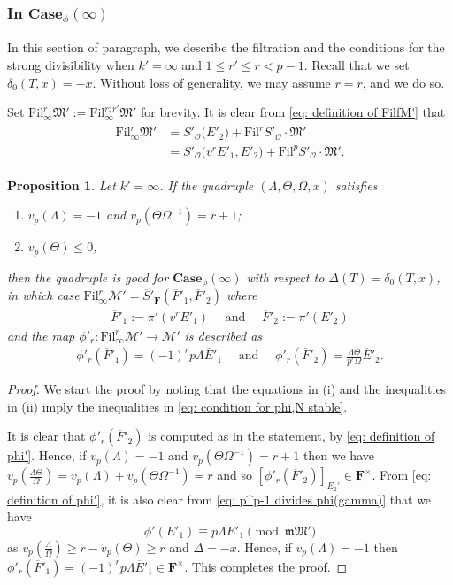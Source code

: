 \documentclass[11pt]{amsart}
\theoremstyle{definition}
\numberwithin{equation}{subsection}
\theoremstyle{plain}
\theoremstyle{plain}
\theoremstyle{plain}
\theoremstyle{plain}
\theoremstyle{plain}
\theoremstyle{plain}
\theoremstyle{plain}
\theoremstyle{plain}
\newtheorem{prop}[equation]{Proposition}
\theoremstyle{plain}
\theoremstyle{plain}
\theoremstyle{plain}
\theoremstyle{plain}
\theoremstyle{definition}
\theoremstyle{definition}
\theoremstyle{definition}
\theoremstyle{remark}
\renewcommand{\(}{\textup{(}}
\renewcommand{\)}{\textup{)}}
\newcommand{\F}{\mathbf{F}}
\newcommand{\barS}{\overline{S}}
\newcommand{\cM}{\mathcal{M}}
\newcommand{\fM}{\mathfrak{M}}
\newcommand{\fm}{\mathfrak{m}}
\newcommand{\Fil}{\mathrm{Fil}}
\newcommand{\cO}{\mathcal{O}}
\newcommand{\barE}{\overline{E}}
\newcommand{\barF}{\overline{F}}
\begin{document}
\subsubsection{\textbf{In $\mathbf{Case}_\phi(\infty)$}}
In this section of paragraph, we describe the filtration and the conditions for the strong divisibility when $k'=\infty$ and $1\leq r'\leq r <p-1$. Recall that we set $\delta_0(T,x)=-x$. Without loss of generality, we may assume $r=r$, and we do so.


Set $\Fil^r_\infty\fM':=\Fil^{r;r'}_\infty\fM'$ for brevity. It is clear from \eqref{eq: definition of FilfM'} that
\begin{align}\label{eq: generators of the filtration, infty}
\begin{split}
\Fil^r_\infty\fM'&=S'_\cO\big(E'_2\big)+\Fil^rS'_\cO\cdot\fM'\\
&=S'_\cO\big(v^rE'_1,E'_2\big)+\Fil^pS'_\cO\cdot\fM'.
\end{split}
\end{align}

\begin{prop}\label{prop: case infty}
Let $k'=\infty$. If the quadruple $(\Lambda,\Theta,\Omega,x)$ satisfies
    \begin{enumerate}[leftmargin=*]
    \item $v_p(\Lambda)=-1$ and $v_p(\Theta\Omega^{-1})=r+1$;
    \item $v_p(\Theta)\leq 0$,
    \end{enumerate}
then the quadruple is good for $\mathbf{Case}_\phi(\infty)$ with respect to $\Delta(T)=\delta_0(T,x)$, in which case
$\Fil^{r}_\infty\cM'=\barS'_\F(\barF'_1,\barF'_2)$ where
    \begin{align*}
    \barF'_1:=\pi'(v^rE'_1)\quad\mbox{ and }\quad \barF'_2:=\pi'(E'_2)
    \end{align*}
    and the map $\phi'_r:\Fil^{r}_\infty\cM'\to\cM'$ is described as
    \begin{align*}
        \phi'_r(\barF'_1)=(-1)^rp\Lambda\barE'_1 \quad\mbox{ and }\quad
        \phi'_r(\barF'_2)=\frac{\Lambda\Theta}{p^r\Omega}\barE'_2.
    \end{align*}
\end{prop}

\begin{proof}
We start the proof by noting that the equations in (i) and the inequalities in (ii) imply the inequalities in \eqref{eq: condition for phi,N stable}.

It is clear that $\phi'_r(\barF'_2)$ is computed as in the statement, by \eqref{eq: definition of phi'}. Hence, if $v_p(\Lambda)=-1$ and $v_p(\Theta\Omega^{-1})=r+1$ then we have $v_p(\frac{\Lambda\Theta}{\Omega})=v_p(\Lambda)+v_p(\Theta\Omega^{-1})=r$ and so $[\phi'_r(\barF'_2)]_{\barE_2'}\in\F^\times$. From \eqref{eq: definition of phi'}, it is also clear from \eqref{eq: p^p-1 divides phi(gamma)} that we have
$$\phi'(E'_1)\equiv p\Lambda E'_1\pmod{\fm\fM'}$$
as $v_p(\frac{\Lambda}{\Omega})\geq r-v_p(\Theta)\geq r$ and $\Delta=-x$.
Hence, if $v_p(\Lambda)=-1$ then $\phi'_r(\barF'_1)=(-1)^rp\Lambda\barE'_1\in\F^\times$. This completes the proof.
\end{proof}
\end{document}
